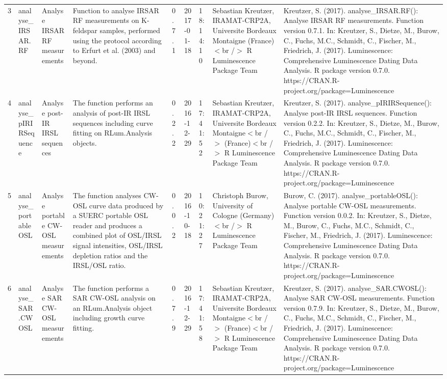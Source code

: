 \begin{table}[ht]
\begin{tabular}{rllllllll}
 \\ 
  3 & analyse\_IRSAR.RF & Analyse IRSAR RF measurements & Function to analyse IRSAR RF measurements on K-feldspar samples, performed using the protocol according to Erfurt et al. (2003) and beyond. & 0.7.1 & 2017-01-18 & 18:14:10
 & Sebastian Kreutzer, IRAMAT-CRP2A, Universite Bordeaux Montaigne (France)$<$br /$>$  R Luminescence Package Team & Kreutzer, S. (2017). analyse\_IRSAR.RF(): Analyse IRSAR RF measurements. Function version 0.7.1. In: Kreutzer, S., Dietze, M., Burow, C., Fuchs, M.C., Schmidt, C., Fischer, M., Friedrich, J. (2017). Luminescence: Comprehensive Luminescence Dating Data Analysis. R package version 0.7.0. https://CRAN.R-project.org/package=Luminescence
 \\ 
  4 & analyse\_pIRIRSequence & Analyse post-IR IRSL sequences & The function performs an analysis of post-IR IRSL sequences including curve fitting on  RLum.Analysis  objects. & 0.2.2 & 2016-12-29 & 17:41:52
 & Sebastian Kreutzer, IRAMAT-CRP2A, Universite Bordeaux Montaigne$<$br /$>$ (France)$<$br /$>$  R Luminescence Package Team & Kreutzer, S. (2017). analyse\_pIRIRSequence(): Analyse post-IR IRSL sequences. Function version 0.2.2. In: Kreutzer, S., Dietze, M., Burow, C., Fuchs, M.C., Schmidt, C., Fischer, M., Friedrich, J. (2017). Luminescence: Comprehensive Luminescence Dating Data Analysis. R package version 0.7.0. https://CRAN.R-project.org/package=Luminescence
 \\ 
  5 & analyse\_portableOSL & Analyse portable CW-OSL measurements & The function analyses CW-OSL curve data produced by a SUERC portable OSL reader and produces a combined plot of OSL/IRSL signal intensities, OSL/IRSL depletion ratios and the IRSL/OSL ratio. & 0.0.2 & 2016-10-18 & 10:21:27
 & Christoph Burow, University of Cologne (Germany)$<$br /$>$  R Luminescence Package Team & Burow, C. (2017). analyse\_portableOSL(): Analyse portable CW-OSL measurements. Function version 0.0.2. In: Kreutzer, S., Dietze, M., Burow, C., Fuchs, M.C., Schmidt, C., Fischer, M., Friedrich, J. (2017). Luminescence: Comprehensive Luminescence Dating Data Analysis. R package version 0.7.0. https://CRAN.R-project.org/package=Luminescence
 \\ 
  6 & analyse\_SAR.CWOSL & Analyse SAR CW-OSL measurements & The function performs a SAR CW-OSL analysis on an RLum.Analysis  object including growth curve fitting. & 0.7.9 & 2016-12-29 & 17:41:58
 & Sebastian Kreutzer, IRAMAT-CRP2A, Universite Bordeaux Montaigne$<$br /$>$ (France)$<$br /$>$  R Luminescence Package Team & Kreutzer, S. (2017). analyse\_SAR.CWOSL(): Analyse SAR CW-OSL measurements. Function version 0.7.9. In: Kreutzer, S., Dietze, M., Burow, C., Fuchs, M.C., Schmidt, C., Fischer, M., Friedrich, J. (2017). Luminescence: Comprehensive Luminescence Dating Data Analysis. R package version 0.7.0. https://CRAN.R-project.org/package=Luminescence

\end{tabular}
\end{table}
